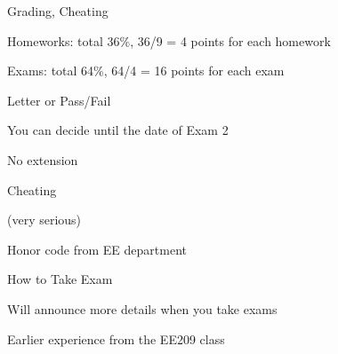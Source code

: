 \begin{frame}{Grading, Cheating}

\bci 

\item Homeworks: total 36\%, 36/9 = 4 points for each homework

\item Exams: total 64\%, 64/4 = 16 points for each exam 


\item Letter or Pass/Fail

  \bci
\item You can decide until the date of Exam 2
\item No extension
  \eci

\item Cheating
  \bci
\item {\bf {}} (very serious)
  \item Honor code from EE department

  \eci
  
  \eci

\end{frame}

\begin{frame}{How to Take Exam}


\plitemsep 0.02in

\bci 

\item Will announce more details when you take exams
  
\item Earlier experience from the EE209 class

  \eci

\end{frame}



  
  




